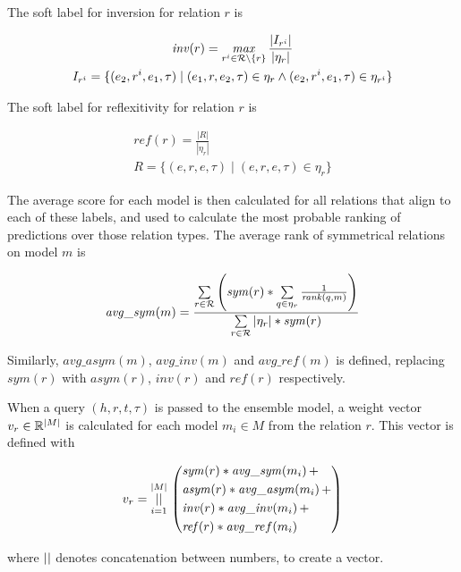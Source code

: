 \noindent
The soft label for inversion for relation $r$ is

\begin{equation}
\begin{gathered}
\mathit{inv}(r) = \operatorname*{\mathit{max}}\limits_{r^i \in \mathcal{R} \setminus \{r\} } \frac{|I_{r^i}|}{|\eta_r|}\\
I_{r^i} = \{ (e_2, r^i, e_1, \tau) \mid (e_1, r, e_2, \tau) \in \eta_r \wedge (e_2, r^i, e_1, \tau) \in \eta_{r^i} \}
\end{gathered}
\end{equation}

\noindent
The soft label for reflexitivity for relation $r$ is

\begin{equation}
\begin{gathered}
\mathit{ref}(r) = \frac{|R|}{|\eta_r|}\\
R = \{ (e, r, e, \tau) \mid (e, r, e, \tau) \in \eta_r \}
\end{gathered}
\end{equation}

The average score for each model is then calculated for all relations that align to each of these labels, and used to calculate the most probable ranking of predictions over those relation types. The average rank of symmetrical relations on model $m$ is


\begin{equation}
\mathit{avg\_sym}(m) = 
\frac{ \sum\limits_{r \in \mathcal{R}} \left( \mathit{sym}(r) * \sum\limits_{q \in \eta_r} \frac{1}{\mathit{rank}(q , m)} \right) }
{ \sum\limits_{r \in \mathcal{R}} |\eta_r| * \mathit{sym}(r) }
\end{equation}

\noindent
Similarly, $\mathit{avg\_asym}(m)$, $\mathit{avg\_inv}(m)$ and $\mathit{avg\_ref}(m)$ is defined, replacing $\mathit{sym}(r)$ with $\mathit{asym}(r)$, $\mathit{inv}(r)$ and $\mathit{ref}(r)$ respectively.

When a query $(h, r, t, \tau)$ is passed to the ensemble model, a weight vector $v_r \in \mathbb{R}^{|M|}$ is calculated for each model $m_i \in M$ from the relation $r$. This vector is defined with

\begin{equation}
v_r = \operatorname*{||}\limits_{i = 1}^{|M|} \, \left(
\begin{aligned}
&\mathit{sym}(r) * \mathit{avg\_sym}(m_i) \, + \\
&\mathit{asym}(r) * \mathit{avg\_asym}(m_i) \, + \\
&\mathit{inv}(r) * \mathit{avg\_inv}(m_i) \, + \\
&\mathit{ref}(r) * \mathit{avg\_re}f(m_i)
\end{aligned} \right)
\end{equation}

\noindent
where $\operatorname*{||}$ denotes concatenation between numbers, to create a vector.